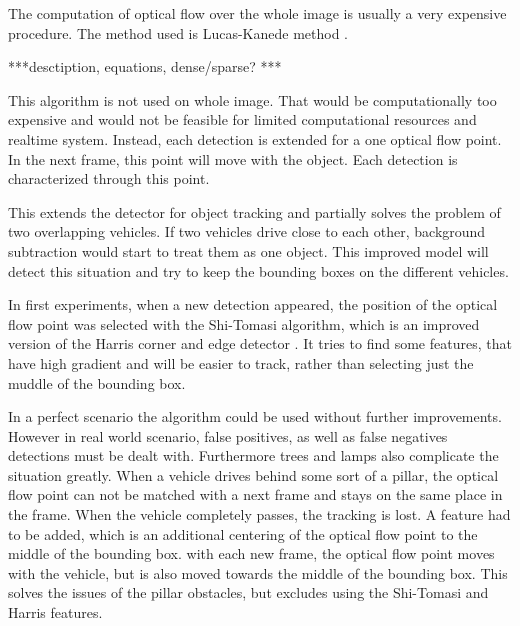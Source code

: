 \documentclass[a4paper,12pt,titlepage, twoside]{article}
\numberwithin{figure}{section}
\begin{document}
The computation of optical flow over the whole image is usually a very expensive procedure. The method used is Lucas-Kanede method \cite{lucas-kanede}. 

***desctiption, equations, dense/sparse? ***


This algorithm is not used on whole image. That would be computationally too expensive and would not be feasible for limited computational resources and realtime system. Instead, each detection is extended for a one optical flow point. In the next frame, this point will move with the object. Each detection is characterized through this point. 

This extends the detector for object tracking and partially solves the problem of two overlapping vehicles. If two vehicles drive close to each other, background subtraction would start to treat them as one object. This improved model will detect this situation and try to keep the bounding boxes on the different vehicles. 

In first experiments, when a new detection appeared, the position of the optical flow point was selected with the Shi-Tomasi \cite{shi-tomasi} algorithm, which is an improved version of the Harris corner and edge detector \cite{harris}. It tries to find some features, that have high gradient and will be easier to track, rather than selecting just the muddle of the bounding box.



In a perfect scenario the algorithm could be used without further improvements. However in real world scenario, false positives, as well as false negatives detections must be dealt with. Furthermore trees and lamps also complicate the situation greatly. When a vehicle drives behind some sort of a pillar, the optical flow point can not be matched with a next frame and stays on the same place in the frame. When the vehicle completely passes, the tracking is lost. A feature had to be added, which is an additional centering of the optical flow point to the middle of the bounding box. with each new frame, the optical flow point moves with the vehicle, but is also moved towards the middle of the bounding box. This solves the issues of the pillar obstacles, but excludes using the Shi-Tomasi and Harris features. 
\end{document}
